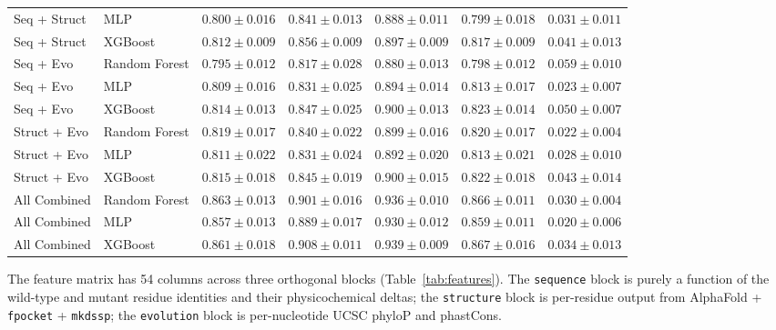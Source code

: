 \documentclass{article}
\begin{document}
\begin{table}[H]
{\begin{tabular}{llccccc}
    Seq + Struct & MLP           & $0.800 \pm 0.016$ & $0.841 \pm 0.013$ & $0.888 \pm 0.011$ & $0.799 \pm 0.018$ & $0.031 \pm 0.011$ \\
    Seq + Struct & XGBoost       & $0.812 \pm 0.009$ & $0.856 \pm 0.009$ & $0.897 \pm 0.009$ & $0.817 \pm 0.009$ & $0.041 \pm 0.013$ \\
    \midrule
    Seq + Evo    & Random Forest & $0.795 \pm 0.012$ & $0.817 \pm 0.028$ & $0.880 \pm 0.013$ & $0.798 \pm 0.012$ & $0.059 \pm 0.010$ \\
    Seq + Evo    & MLP           & $0.809 \pm 0.016$ & $0.831 \pm 0.025$ & $0.894 \pm 0.014$ & $0.813 \pm 0.017$ & $0.023 \pm 0.007$ \\
    Seq + Evo    & XGBoost       & $0.814 \pm 0.013$ & $0.847 \pm 0.025$ & $0.900 \pm 0.013$ & $0.823 \pm 0.014$ & $0.050 \pm 0.007$ \\
    \midrule
    Struct + Evo & Random Forest & $0.819 \pm 0.017$ & $0.840 \pm 0.022$ & $0.899 \pm 0.016$ & $0.820 \pm 0.017$ & $\mathbf{0.022 \pm 0.004}$ \\
    Struct + Evo & MLP           & $0.811 \pm 0.022$ & $0.831 \pm 0.024$ & $0.892 \pm 0.020$ & $0.813 \pm 0.021$ & $0.028 \pm 0.010$ \\
    Struct + Evo & XGBoost       & $0.815 \pm 0.018$ & $0.845 \pm 0.019$ & $0.900 \pm 0.015$ & $0.822 \pm 0.018$ & $0.043 \pm 0.014$ \\
    \midrule
    All Combined & Random Forest & $\mathbf{0.863 \pm 0.013}$ & $\mathbf{0.901 \pm 0.016}$ & $\mathbf{0.936 \pm 0.010}$ & $\mathbf{0.866 \pm 0.011}$ & $0.030 \pm 0.004$ \\
    All Combined & MLP           & $\mathbf{0.857 \pm 0.013}$ & $\mathbf{0.889 \pm 0.017}$ & $\mathbf{0.930 \pm 0.012}$ & $\mathbf{0.859 \pm 0.011}$ & $\mathbf{0.020 \pm 0.006}$ \\
    All Combined & XGBoost       & $\mathbf{0.861 \pm 0.018}$ & $\mathbf{0.908 \pm 0.011}$ & $\mathbf{0.939 \pm 0.009}$ & $\mathbf{0.867 \pm 0.016}$ & $\mathbf{0.034 \pm 0.013}$ \\
    \bottomrule
  \end{tabular}%
  }
\end{table}

\clearpage
{}\par
\vspace{0.4em}
\label{app:features}

The feature matrix has 54 columns across three orthogonal blocks
(Table~\ref{tab:features}). The \texttt{sequence} block is purely a
function of the wild-type and mutant residue identities and their
physicochemical deltas; the \texttt{structure} block is per-residue
output from AlphaFold + \texttt{fpocket} + \texttt{mkdssp}; the
\texttt{evolution} block is per-nucleotide UCSC phyloP and phastCons.
\end{document}

